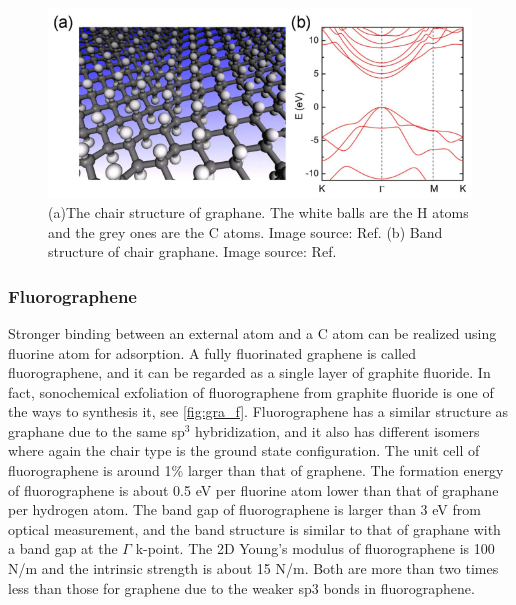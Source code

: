 \begin{figure}[htbp!] 
\centering  
\includegraphics[width=1\textwidth]{graphane.eps}
\caption[Atomic and electronic structure of graphane]{(a)The chair structure of graphane. The white balls are the H atoms and the grey ones are the C atoms. Image source: Ref. \cite{Sofo2007} (b) Band structure of chair graphane. Image source: Ref. \cite{leenaerts2010}}  
\label{fig:gra_h}
\end{figure} 

\subsubsection{Fluorographene}

Stronger binding between an external atom and a C atom can be realized using fluorine atom for adsorption. A fully fluorinated graphene is called fluorographene, and it can be regarded as a single layer of graphite fluoride. In fact, sonochemical exfoliation of fluorographene from graphite fluoride is one of the ways to synthesis it, see \autoref{fig:gra_f}\cite{Zhu2013}. Fluorographene has a similar structure as graphane due to the same sp$^3$ hybridization, and it also has different isomers where again the chair type is the ground state configuration\cite{samarakoon2011}. The unit cell of fluorographene is around 1\% larger than that of graphene\cite{nair2010}. The formation energy of fluorographene is about 0.5 eV per fluorine atom lower than that of graphane per hydrogen atom\cite{Jeon2011}. The band gap of fluorographene is larger than 3 eV from optical measurement\cite{nair2010,Jeon2011}, and the band structure is similar to that of graphane with a band gap at the $\Gamma$ k-point. The 2D Young's modulus of fluorographene is 100 \si{N/m} and the intrinsic strength is about 15 \si{N/m}. Both are more than two times less than those for graphene due to the weaker sp$3$ bonds in fluorographene\cite{nair2010}.

